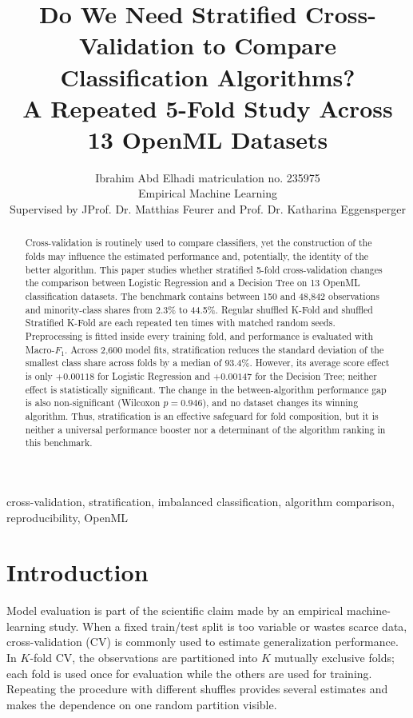 \documentclass[twoside,11pt]{article}
\newcommand{\macrof}{Macro-$F_1$}
\begin{document}
\title{Do We Need Stratified Cross-Validation to Compare Classification Algorithms?\\
\large A Repeated 5-Fold Study Across 13 OpenML Datasets}

\author{\name Ibrahim Abd Elhadi \email matriculation no. 235975 \\
       \addr Empirical Machine Learning\\
       Supervised by JProf. Dr. Matthias Feurer and Prof. Dr. Katharina Eggensperger}


\maketitle

\begin{abstract}%
Cross-validation is routinely used to compare classifiers, yet the construction of the folds may influence the estimated performance and, potentially, the identity of the better algorithm. This paper studies whether stratified 5-fold cross-validation changes the comparison between Logistic Regression and a Decision Tree on 13 OpenML classification datasets. The benchmark contains between 150 and 48,842 observations and minority-class shares from 2.3\% to 44.5\%. Regular shuffled K-Fold and shuffled Stratified K-Fold are each repeated ten times with matched random seeds. Preprocessing is fitted inside every training fold, and performance is evaluated with \macrof. Across 2,600 model fits, stratification reduces the standard deviation of the smallest class share across folds by a median of 93.4\%. However, its average score effect is only $+0.00118$ for Logistic Regression and $+0.00147$ for the Decision Tree; neither effect is statistically significant. The change in the between-algorithm performance gap is also non-significant (Wilcoxon $p=0.946$), and no dataset changes its winning algorithm. Thus, stratification is an effective safeguard for fold composition, but it is neither a universal performance booster nor a determinant of the algorithm ranking in this benchmark.
\end{abstract}

\begin{keywords}
cross-validation, stratification, imbalanced classification, algorithm comparison, reproducibility, OpenML
\end{keywords}

\section{Introduction}
Model evaluation is part of the scientific claim made by an empirical machine-learning study. When a fixed train/test split is too variable or wastes scarce data, cross-validation (CV) is commonly used to estimate generalization performance. In $K$-fold CV, the observations are partitioned into $K$ mutually exclusive folds; each fold is used once for evaluation while the others are used for training. Repeating the procedure with different shuffles provides several estimates and makes the dependence on one random partition visible.
\end{document}
